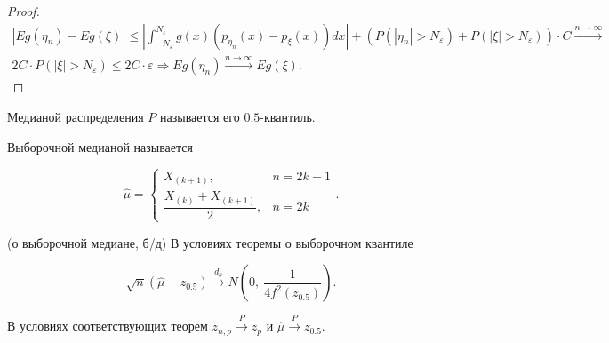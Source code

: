 \begin{proof}
\begin{gather*}
    | Eg( \eta _{n}) -Eg( \xi )| \leqslant \left| \int _{-N_{\varepsilon }}^{N_{\varepsilon }} g( x)( p_{\eta _{n}}( x) -p_{\xi }( x))dx\right| + (P(| \eta _{n}|  >N_{\varepsilon }) + P( |\xi | >N_{\varepsilon })) \cdotp C \xrightarrow{n\rightarrow\infty}\\ 2C\cdotp P(| \xi |  >N_{\varepsilon }) \leqslant 2C\cdotp \varepsilon \Rightarrow Eg( \eta _{n})\xrightarrow{n\rightarrow\infty} Eg( \xi ) .
\end{gather*}
\end{proof}

\begin{definition}
    Медианой распределения $\displaystyle P$ называется его $\displaystyle 0.5$-квантиль.
    \end{definition}
    \begin{definition}
    Выборочной медианой называется
    
    
    \begin{equation*}
    \hat{\mu } =\begin{cases}
    X_{( k+1)} , & n=2k+1\\
    \dfrac{X_{( k)} +X_{( k+1)}}{2} , & n=2k
    \end{cases} .
    \end{equation*}
    \end{definition}
    \begin{theorem}
    (о выборочной медиане, б/д) В условиях теоремы о выборочном квантиле
    
    
    \begin{equation*}
    \sqrt{n}(\hat{\mu } -z_{0.5})\xrightarrow{d_{\theta }} N\left( 0,\ \frac{1}{4f^{2}( z_{0.5})}\right) .
    \end{equation*}
    \end{theorem}

    \begin{note}
    В условиях соответствующих теорем $\displaystyle z_{n,p}\xrightarrow{P} z_{p}$ и $\displaystyle \hat{\mu }\xrightarrow{P} z_{0.5}$.
    \end{note}
    